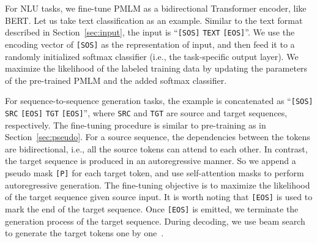 \documentclass{article}
\newcommand\pmlm{\textsc{PMLM}}
\newcommand{\sptk}[1]{\texttt{[#1]}}
\begin{document}
For NLU tasks, we fine-tune \pmlm{} as a bidirectional Transformer encoder, like BERT.
Let us take text classification as an example.
Similar to the text format described in Section~\ref{sec:input}, the input is ``\sptk{SOS} \texttt{TEXT} \sptk{EOS}''.
We use the encoding vector of \sptk{SOS} as the representation of input, and then feed it to a randomly initialized softmax classifier (i.e., the task-specific output layer).
We maximize the likelihood of the labeled training data by updating the parameters of the pre-trained \pmlm{} and the added softmax classifier.

For sequence-to-sequence generation tasks, the example is concatenated as ``\sptk{SOS} \texttt{SRC} \sptk{EOS} \texttt{TGT} \sptk{EOS}'', where \texttt{SRC} and \texttt{TGT} are source and target sequences, respectively.
The fine-tuning procedure is similar to pre-training as in Section~\ref{sec:pseudo}.
For a source sequence, the dependencies between the tokens are bidirectional, i.e., all the source tokens can attend to each other.
In contrast, the target sequence is produced in an autoregressive manner.
So we append a pseudo mask \sptk{P} for each target token, and use self-attention masks to perform autoregressive generation.
The fine-tuning objective is to maximize the likelihood of the target sequence given source input.
It is worth noting that \sptk{EOS} is used to mark the end of the target sequence.
Once \sptk{EOS} is emitted, we terminate the generation process of the target sequence.
During decoding, we use beam search to generate the target tokens one by one~\cite{unilm}.
\end{document}
